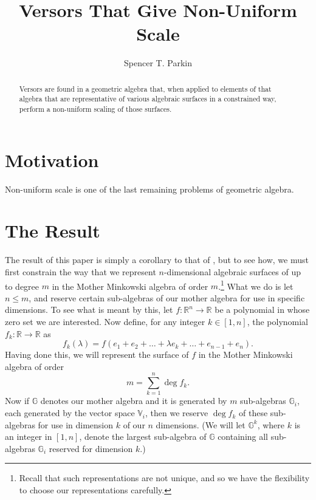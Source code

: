\documentclass{birkjour}
\theoremstyle{definition}
\theoremstyle{remark}
\numberwithin{equation}{section}
\newcommand{\R}{\mathbb{R}}
\newcommand{\G}{\mathbb{G}}
\newcommand{\V}{\mathbb{V}}
\begin{document}
\title{Versors That Give Non-Uniform Scale}

\author{Spencer T. Parkin}
\address{102 W. 500 S., \\
Salt Lake City, UT  84101} 



\begin{abstract}
Versors are found in a geometric algebra that,
when applied to elements of that algebra that are representative
of various algebraic surfaces in a constrained way, perform a non-uniform scaling
of those surfaces.
\end{abstract}


\maketitle

\section{Motivation}

Non-uniform scale is one of the last remaining problems of geometric algebra.

\section{The Result}

The result of this paper is simply a corollary to that of \cite{Parkin13}, but to see how,
we must first constrain the way that we represent $n$-dimensional algebraic surfaces of up to degree $m$
in the Mother Minkowski algebra of order $m$.\footnote{Recall that such representations are not unique, and so
we have the flexibility to choose our representations carefully.} What we do is let $n\leq m$, and
reserve certain sub-algebras of our mother algebra for use in specific dimensions.
To see what is meant by this, let $f:\R^n\to\R$ be a polynomial in whose zero set
we are interested.  Now define, for any integer $k\in[1,n]$, the polynomial $f_k:\R\to\R$ as
\begin{equation*}
f_k(\lambda)=f(e_1+e_2+\dots+\lambda e_k+\dots +e_{n-1}+e_n).
\end{equation*}
Having done this, we will represent the
surface of $f$ in the Mother Minkowski algebra of order
\begin{equation*}
m=\sum_{k=1}^n\deg f_k.
\end{equation*}
Now if $\G$ denotes our mother algebra and it is generated by $m$ sub-algebras $\G_i$,
each generated by the vector space $\V_i$, then we reserve $\deg f_k$
of these sub-algebras for use in dimension $k$ of our $n$ dimensions.
(We will let $\G^k$, where $k$ is an integer in $[1,n]$, denote the largest
sub-algebra of $\G$ containing all sub-algebras $\G_i$ reserved for dimension $k$.)
\end{document}
